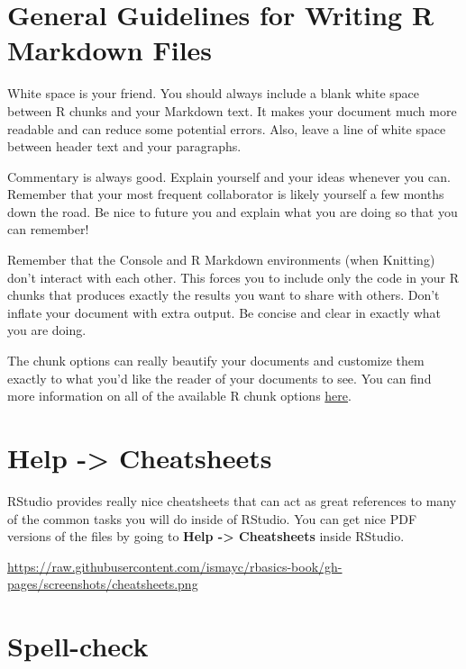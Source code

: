 \documentclass[]{tufte-book}
\begin{document}
\section{General Guidelines for Writing R Markdown Files}\label{general-guidelines-for-writing-r-markdown-files}

White space is your friend. You should always include a blank white space between R chunks and your Markdown text. It makes your document much more readable and can reduce some potential errors. Also, leave a line of white space between header text and your paragraphs.

Commentary is always good. Explain yourself and your ideas whenever you can. Remember that your most frequent collaborator is likely yourself a few months down the road. Be nice to future you and explain what you are doing so that you can remember!

Remember that the Console and R Markdown environments (when Knitting) don't interact with each other. This forces you to include only the code in your R chunks that produces exactly the results you want to share with others. Don't inflate your document with extra output. Be concise and clear in exactly what you are doing.

The chunk options can really beautify your documents and customize them exactly to what you'd like the reader of your documents to see. You can find more information on all of the available R chunk options \href{http://yihui.name/knitr/options/}{here}.

\section{Help -\textgreater{} Cheatsheets}\label{help---cheatsheets}

RStudio provides really nice cheatsheets that can act as great references to many of the common tasks you will do inside of RStudio. You can get nice PDF versions of the files by going to \textbf{Help -\textgreater{} Cheatsheets} inside RStudio.

\vspace{0.1in}\begin{center}\footnotesize{\url{https://raw.githubusercontent.com/ismayc/rbasics-book/gh-pages/screenshots/cheatsheets.png}}\end{center}\vspace{0.1in}

\section{Spell-check}\label{spell-check}
\end{document}
